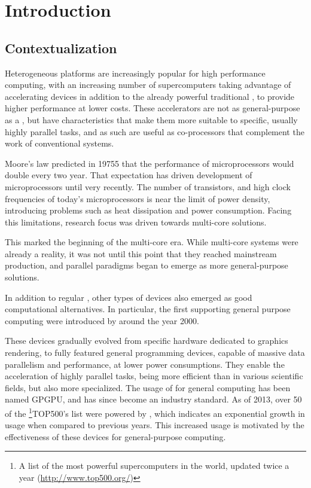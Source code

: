 \documentclass[main.tex]{subfiles}
\begin{document}
\chapter{Introduction}

\section{Contextualization}

Heterogeneous platforms are increasingly popular for high performance computing, with an increasing number of supercomputers taking advantage of accelerating devices in addition to the already powerful traditional \cpus, to provide higher performance at lower costs. These accelerators are not as general-purpose as a \cpu, but have characteristics that make them more suitable to specific, usually highly parallel tasks, and as such are useful as co-processors that complement the work of conventional systems.

Moore's law \cite{moore1965cramming,moore1975progress} predicted in 19755 that the performance of microprocessors would double every two year. That expectation has driven development of microprocessors until very recently. The number of transistors, and high clock frequencies of today's microprocessors is near the limit of power density, introducing problems such as heat dissipation and power consumption. Facing this limitations, research focus was driven towards multi-core solutions.

This marked the beginning of the multi-core era. While multi-core systems were already a reality, it was not until this point that they reached mainstream production, and parallel paradigms began to emerge as more general-purpose solutions.

In addition to regular \cpus, other types of devices also emerged as good computational alternatives. In particular, the first \gpus supporting general purpose computing were introduced by \nvidia around the year 2000.

These devices gradually evolved from specific hardware dedicated to graphics rendering, to fully featured general programming devices, capable of massive data parallelism and performance, at lower power consumptions.
They enable the acceleration of highly parallel tasks, being more efficient than \cpus in various scientific fields, but also more specialized. The usage of \gpus for general computing has been named \ac{GPGPU}, and has since become an industry standard.
As of 2013, over 50 of the \footnote{A list of the most powerful supercomputers in the world, updated twice a year (\url{http://www.top500.org/})}{TOP500's} list were powered by \gpus, which indicates an exponential growth in usage when compared to previous years. This increased usage is motivated by the effectiveness of these devices for general-purpose computing.
\end{document}
